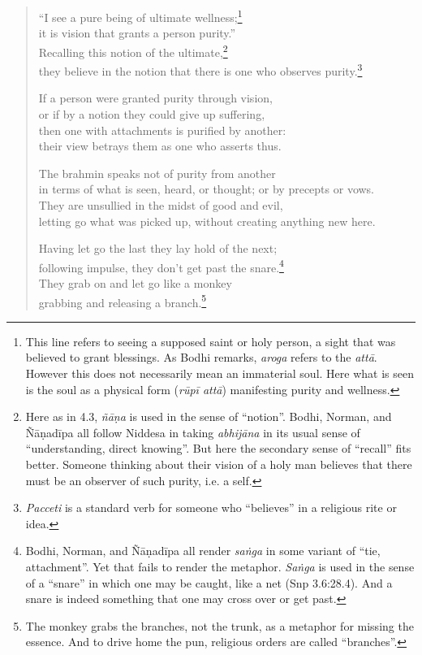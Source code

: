 \documentclass[12pt,openany]{book}%
\begin{document}
\begin{verse}%
“I see a pure being of ultimate wellness;\footnote{This line refers to seeing a supposed saint or holy person, a sight that was believed to grant blessings. As Bodhi remarks, \textit{aroga} refers to the \textit{\textsanskrit{attā}}. However this does not necessarily mean an immaterial soul. Here what is seen is the soul as a physical form (\textit{\textsanskrit{rūpī} \textsanskrit{attā}}) manifesting purity and wellness. } \\
it is vision that grants a person purity.” \\
Recalling this notion of the ultimate,\footnote{Here as in 4.3, \textit{\textsanskrit{ñāṇa}} is used in the sense of “notion”. Bodhi, Norman, and \textsanskrit{Ñāṇadīpa} all follow Niddesa in taking \textit{\textsanskrit{abhijāna}} in its usual sense of “understanding, direct knowing”. But here the secondary sense of “recall” fits better. Someone thinking about their vision of a holy man believes that there must be an observer of such purity, i.e. a self. } \\
they believe in the notion that there is one who observes purity.\footnote{\textit{Pacceti} is a standard verb for someone who “believes” in a religious rite or idea. } 

If a person were granted purity through vision, \\
or if by a notion they could give up suffering, \\
then one with attachments is purified by another: \\
their view betrays them as one who asserts thus. 

The brahmin speaks not of purity from another \\
in terms of what is seen, heard, or thought; or by precepts or vows. \\
They are unsullied in the midst of good and evil, \\
letting go what was picked up, without creating anything new here. 

Having let go the last they lay hold of the next; \\
following impulse, they don’t get past the snare.\footnote{Bodhi, Norman, and \textsanskrit{Ñāṇadīpa} all render \textit{\textsanskrit{saṅga}} in some variant of “tie, attachment”. Yet that fails to render the metaphor. \textit{\textsanskrit{Saṅga}} is used in the sense of a “snare” in which one may be caught, like a net (Snp 3.6:28.4). And a snare is indeed something that one may cross over or get past. } \\
They grab on and let go like a monkey \\
grabbing and releasing a branch.\footnote{The monkey grabs the branches, not the trunk, as a metaphor for missing the essence. And to drive home the pun, religious orders are called “branches”. } 


\end{verse}
\end{document}
